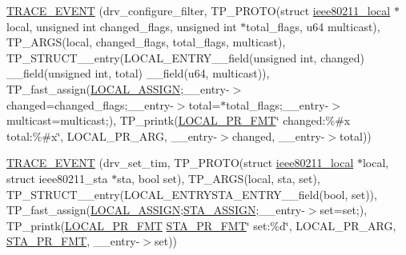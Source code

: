 \begin{DoxyCompactItemize}
\item 
\hyperlink{driver-trace_8h_aa75bea48274d005ac08e0c50ad93fbf8}{T\-R\-A\-C\-E\-\_\-\-E\-V\-E\-N\-T} (drv\-\_\-configure\-\_\-filter, T\-P\-\_\-\-P\-R\-O\-T\-O(struct \hyperlink{structieee80211__local}{ieee80211\-\_\-local} $\ast$local, unsigned int changed\-\_\-flags, unsigned int $\ast$total\-\_\-flags, u64 multicast), T\-P\-\_\-\-A\-R\-G\-S(local, changed\-\_\-flags, total\-\_\-flags, multicast), T\-P\-\_\-\-S\-T\-R\-U\-C\-T\-\_\-\-\_\-entry(L\-O\-C\-A\-L\-\_\-\-E\-N\-T\-R\-Y\-\_\-\-\_\-field(unsigned int, changed) \-\_\-\-\_\-field(unsigned int, total) \-\_\-\-\_\-field(u64, multicast)), T\-P\-\_\-fast\-\_\-assign(\hyperlink{driver-trace_8h_ab19d9141887ea92ef9640df06a51e0a1}{L\-O\-C\-A\-L\-\_\-\-A\-S\-S\-I\-G\-N};\-\_\-\-\_\-entry-\/$>$changed=changed\-\_\-flags;\-\_\-\-\_\-entry-\/$>$total=$\ast$total\-\_\-flags;\-\_\-\-\_\-entry-\/$>$multicast=multicast;), T\-P\-\_\-printk(\hyperlink{driver-trace_8h_a09833af423135e21ffe99a59ae088cf1}{L\-O\-C\-A\-L\-\_\-\-P\-R\-\_\-\-F\-M\-T}\char`\"{} changed\-:\%\#x total\-:\%\#x\char`\"{}, L\-O\-C\-A\-L\-\_\-\-P\-R\-\_\-\-A\-R\-G, \-\_\-\-\_\-entry-\/$>$changed, \-\_\-\-\_\-entry-\/$>$total))
\item 
\hyperlink{driver-trace_8h_af1a68e2e4d5b3a392ef649bb575700d6}{T\-R\-A\-C\-E\-\_\-\-E\-V\-E\-N\-T} (drv\-\_\-set\-\_\-tim, T\-P\-\_\-\-P\-R\-O\-T\-O(struct \hyperlink{structieee80211__local}{ieee80211\-\_\-local} $\ast$local, struct ieee80211\-\_\-sta $\ast$sta, bool set), T\-P\-\_\-\-A\-R\-G\-S(local, sta, set), T\-P\-\_\-\-S\-T\-R\-U\-C\-T\-\_\-\-\_\-entry(L\-O\-C\-A\-L\-\_\-\-E\-N\-T\-R\-Y\-S\-T\-A\-\_\-\-E\-N\-T\-R\-Y\-\_\-\-\_\-field(bool, set)), T\-P\-\_\-fast\-\_\-assign(\hyperlink{driver-trace_8h_ab19d9141887ea92ef9640df06a51e0a1}{L\-O\-C\-A\-L\-\_\-\-A\-S\-S\-I\-G\-N};\hyperlink{driver-trace_8h_abbd837b5fc444c0cb48b5954f8ad068a}{S\-T\-A\-\_\-\-A\-S\-S\-I\-G\-N};\-\_\-\-\_\-entry-\/$>$set=set;), T\-P\-\_\-printk(\hyperlink{driver-trace_8h_a09833af423135e21ffe99a59ae088cf1}{L\-O\-C\-A\-L\-\_\-\-P\-R\-\_\-\-F\-M\-T} \hyperlink{driver-trace_8h_a73d0cd445b999888e3f21698b769c843}{S\-T\-A\-\_\-\-P\-R\-\_\-\-F\-M\-T}\char`\"{} set\-:\%d\char`\"{}, L\-O\-C\-A\-L\-\_\-\-P\-R\-\_\-\-A\-R\-G, \hyperlink{driver-trace_8h_a73d0cd445b999888e3f21698b769c843}{S\-T\-A\-\_\-\-P\-R\-\_\-\-F\-M\-T}, \-\_\-\-\_\-entry-\/$>$set))
\item 

\end{DoxyCompactItemize}
